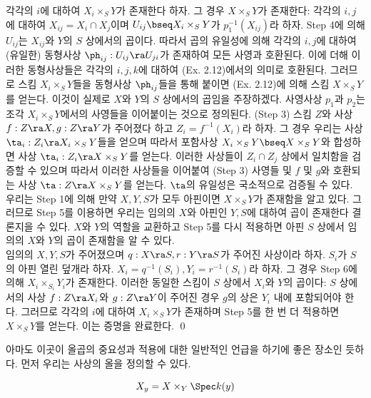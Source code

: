 \begin{theorem}
{		각각의 $i$에 대하여 $X_i\times_SY$가 존재한다 하자. 그 경우 $X\times_SY$가 존재한다:
		각각의 $i,j$에 대하여 $X_{ij}=X_i\cap X_j$이며 $U_{ij}\bseq X_i\times_SY$가 $p_1^{-1}(X_{ij})$라 하자.
		Step 4에 의해 $U_{ij}$는 $X_{ij}$와 $Y$의 $S$ 상에서의 곱이다.
		따라서 곱의 유일성에 의해 각각의 $i,j$에 대하여 (유일한) 동형사상 $\ph_{ij}:U_{ij}\ra U_{ji}$가 존재하여 모든 사영과 호환된다.
		이에 더해 이러한 동형사상들은 각각의 $i,j,k$에 대하여 (Ex. 2.12)에서의 의미로 호환된다.
		그러므로 스킴 $X_i\times_SY$들을 동형사상 $\ph_{ij}$들을 통해 붙이면 (Ex. 2.12)에 의해 스킴 $X\times_SY$를 얻는다.
		이것이 실제로 $X$와 $Y$의 $S$ 상에서의 곱임을 주장하겠다.
		사영사상 $p_1$과 $p_2$는 조각 $X_i\times_SY$에서의 사영들을 이어붙이는 것으로 정의된다. (Step 3)
		스킴 $Z$와 사상 $f:Z\ra X,g:Z\ra Y$가 주어졌다 하고 $Z_i=f^{-1}(X_i)$라 하자.
		그 경우 우리는 사상 $\ta_i:Z_i\ra X_i\times_SY$들을 얻으며 따라서 포함사상 $X_i\times_SY\bseq X\times_SY$와 합성하면
		사상 $\ta_i:Z_i\ra X\times_SY$를 얻는다. 이러한 사상들이 $Z_i\cap Z_j$ 상에서 일치함을 검증할 수 있으며
		따라서 이러한 사상들을 이어붙여 (Step 3) 사영들 및 $f$ 및 $g$와 호환되는 사상 $\ta:Z\ra X\times_SY$를 얻는다.
		$\ta$의 유일성은 국소적으로 검증될 수 있다.\\
		 우리는 Step 1에 의해 만약 $X,Y,S$가 모두 아핀이면 $X\times_SY$가 존재함을 알고 있다.
		그러므로 Step 5를 이용하면 우리는 임의의 $X$와 아핀인 $Y,S$에 대하여 곱이 존재한다 결론지을 수 있다.
		$X$와 $Y$의 역할을 교환하고 Step 5를 다시 적용하면 아핀 $S$ 상에서 임의의 $X$와 $Y$의 곱이 존재함을 알 수 있다.\\
		 임의의 $X,Y,S$가 주어졌으며 $q:X\ra S,r:Y\ra S$가 주어진 사상이라 하자.
		$S_i$가 $S$의 아핀 열린 덮개라 하자. $X_i=q^{-1}(S_i),Y_i=r^{-1}(S_i)$라 하자.
		그 경우 Step 6에 의해 $X_i\times_{S_i}Y_i$가 존재한다. 이러한 동일한 스킴이 $S$ 상에서 $X_i$와 $Y$의 곱이다:
		$S$ 상에서의 사상 $f:Z\ra X_i$와 $g:Z\ra Y$이 주어진 경우 $g$의 상은 $Y_i$ 내에 포함되어야 한다.
		그러므로 각각의 $i$에 대하여 $X_i\times_SY$가 존재하며 Step 5를 한 번 더 적용하면 $X\times_SY$를 얻는다.
		이는 증명을 완료한다.}
		\qed
	\end{theorem}
	
	아마도 이곳이 올곱의 중요성과 적용에 대한 일반적인 언급을 하기에 좋은 장소인 듯하다.
	먼저 우리는 사상의 올을 정의할 수 있다.
	
	
	\begin{definition}
		$$X_y=X\times_Y\Spec k(y)$$
	\end{definition}
	
